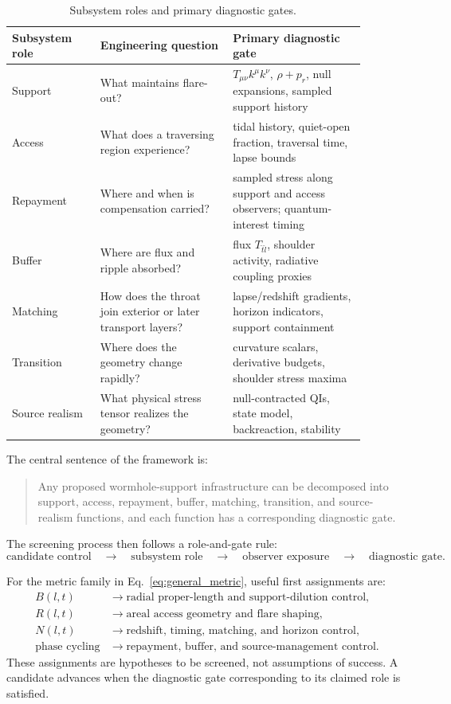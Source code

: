 \documentclass[11pt]{article}
\newcommand{\Tkk}{T_{\mu\nu}k^\mu k^\nu}
\begin{document}
\begin{table}[ht]
\centering
\caption{Subsystem roles and primary diagnostic gates.}
\label{tab:roles}
\begin{tabular}{p{0.22\linewidth}p{0.33\linewidth}p{0.33\linewidth}}
\toprule
Subsystem role & Engineering question & Primary diagnostic gate \\
\midrule
Support & What maintains flare-out? & $\Tkk$, $\rho+p_r$, null expansions, sampled support history \\
Access & What does a traversing region experience? & tidal history, quiet-open fraction, traversal time, lapse bounds \\
Repayment & Where and when is compensation carried? & sampled stress along support and access observers; quantum-interest timing \\
Buffer & Where are flux and ripple absorbed? & flux $T_{\hat t\hat l}$, shoulder activity, radiative coupling proxies \\
Matching & How does the throat join exterior or later transport layers? & lapse/redshift gradients, horizon indicators, support containment \\
Transition & Where does the geometry change rapidly? & curvature scalars, derivative budgets, shoulder stress maxima \\
Source realism & What physical stress tensor realizes the geometry? & null-contracted QIs, state model, backreaction, stability \\
\bottomrule
\end{tabular}
\end{table}

The central sentence of the framework is:

\begin{quote}
Any proposed wormhole-support infrastructure can be decomposed into support, access, repayment, buffer, matching, transition, and source-realism functions, and each function has a corresponding diagnostic gate.
\end{quote}

The screening process then follows a role-and-gate rule:
\begin{equation}
 \text{candidate control}\quad\longrightarrow\quad\text{subsystem role}\quad\longrightarrow\quad\text{observer exposure}\quad\longrightarrow\quad\text{diagnostic gate}.
\end{equation}

For the metric family in Eq.~\eqref{eq:general_metric}, useful first assignments are:
\begin{align}
 B(l,t) &\rightarrow \text{radial proper-length and support-dilution control},\nonumber\\
 R(l,t) &\rightarrow \text{areal access geometry and flare shaping},\nonumber\\
 N(l,t) &\rightarrow \text{redshift, timing, matching, and horizon control},\nonumber\\
 \text{phase cycling} &\rightarrow \text{repayment, buffer, and source-management control}.\nonumber
\end{align}
These assignments are hypotheses to be screened, not assumptions of success.  A candidate advances when the diagnostic gate corresponding to its claimed role is satisfied.
\end{document}
